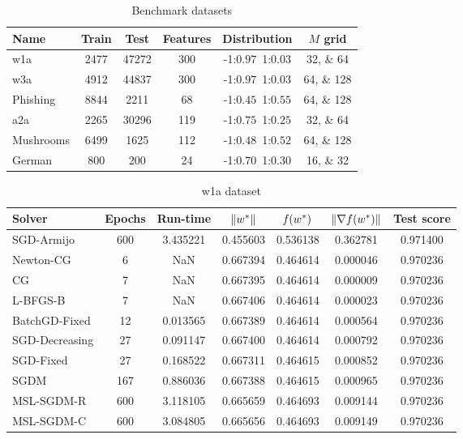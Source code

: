 \begin{table}
\centering
\caption{Benchmark datasets}
\label{tab:datasets}
\begin{tabular}{lSSScc}
\toprule
Name & {Train} & {Test} & {Features} & {Distribution} & {$M$ grid} \\
\midrule
w1a & 2477 & 47272 & 300 & -1:$0.97$\,\,\,1:$0.03$ &
\numlist[list-pair-separator={, }]{32;64} \\
w3a & 4912 & 44837 & 300 & -1:$0.97$\,\,\,1:$0.03$ &
\numlist[list-pair-separator={, }]{64;128} \\
Phishing & 8844 & 2211 & 68 & -1:$0.45$\,\,\,1:$0.55$ &
\numlist[list-pair-separator={, }]{64;128} \\
a2a & 2265 & 30296 & 119 & -1:$0.75$\,\,\,1:$0.25$ &
\numlist[list-pair-separator={, }]{32;64} \\
Mushrooms & 6499 & 1625 & 112 & -1:$0.48$\,\,\,1:$0.52$ &
\numlist[list-pair-separator={, }]{64;128} \\
German & 800 & 200 & 24 & -1:$0.70$\,\,\,1:$0.30$ &
\numlist[list-pair-separator={, }]{16;32} \\
\bottomrule
\end{tabular}
\end{table}

\cleardoublepage

\begin{table}
\centering
\caption{w1a dataset}
\label{tab:w1a-table}
\begin{tabular}{lS[drop-zero-decimal]S[round-precision=4]S[round-precision=6]S[round-precision=6]S[exponent-mode=scientific]S[round-precision=6]}
\toprule
Solver & {Epochs} & {Run-time} & {$\lVert w^\ast\rVert$} & {$\operatorname*{\mathit{f}}(w^\ast)$} & {$\lVert\nabla f(w^\ast)\rVert$} & {Test score} \\
\midrule
SGD-Armijo & 600 & 3.435221 & 0.455603 & 0.536138 & 0.362781 & 0.971400 \\
Newton-CG & 6 & NaN & 0.667394 & 0.464614 & 0.000046 & 0.970236 \\
CG & 7 & NaN & 0.667395 & 0.464614 & 0.000009 & 0.970236 \\
L-BFGS-B & 7 & NaN & 0.667406 & 0.464614 & 0.000023 & 0.970236 \\
BatchGD-Fixed & 12 & 0.013565 & 0.667389 & 0.464614 & 0.000564 & 0.970236 \\
SGD-Decreasing & 27 & 0.091147 & 0.667400 & 0.464614 & 0.000792 & 0.970236 \\
SGD-Fixed & 27 & 0.168522 & 0.667311 & 0.464615 & 0.000852 & 0.970236 \\
SGDM & 167 & 0.886036 & 0.667388 & 0.464615 & 0.000965 & 0.970236 \\
MSL-SGDM-R & 600 & 3.118105 & 0.665659 & 0.464693 & 0.009144 & 0.970236 \\
MSL-SGDM-C & 600 & 3.084805 & 0.665656 & 0.464693 & 0.009149 & 0.970236 \\
\bottomrule
\end{tabular}
\end{table}


